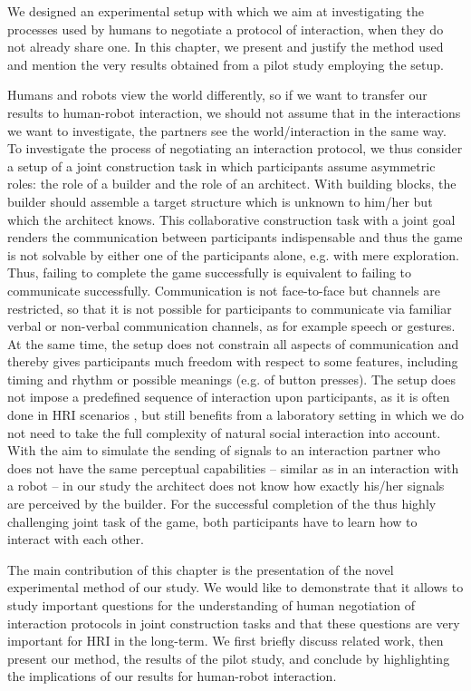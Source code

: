 We designed an experimental setup with which we aim at investigating the processes used by humans to negotiate a protocol of interaction, when they do not already share one. In this chapter, we present and justify the method used and mention the very results obtained from a pilot study employing the setup.

Humans and robots view the world differently, so if we want to transfer our results to human-robot interaction, we should not assume that in the interactions we want to investigate, the partners see the world/interaction in the same way. To investigate the process of negotiating an interaction protocol, we thus consider a setup of a joint construction task in which participants assume asymmetric roles: the role of a builder and the role of an architect. With building blocks, the builder should assemble a target structure which is unknown to him/her but which the architect knows. This collaborative construction task with a joint goal renders the communication between participants indispensable and thus the game is not solvable by either one of the participants alone, e.g. with mere exploration. Thus, failing to complete the game successfully is equivalent to failing to communicate successfully. Communication is not face-to-face but channels are restricted, so that it is not possible for participants to communicate via familiar verbal or non-verbal communication channels, as for example speech or gestures. At the same time, the setup does not constrain all aspects of communication and thereby gives participants much freedom with respect to some features, including timing and rhythm or possible meanings (e.g. of button presses). The setup does not impose a predefined sequence of interaction upon participants, as it is often done in HRI scenarios \cite{akgun12hri}, but still benefits from a laboratory setting in which we do not need to take the full complexity of natural social interaction into account. With the aim to simulate the sending of signals to an interaction partner who does not have the same perceptual capabilities -- similar as in an interaction with a robot -- in our study the architect does not know how exactly his/her signals are perceived by the builder. For the successful completion of the thus highly challenging joint task of the game, both participants have to learn how to interact with each other.

The main contribution of this chapter is the presentation of the novel experimental method of our study. We would like to demonstrate that it allows to study important questions for the understanding of human negotiation of interaction protocols in joint construction tasks and that these questions are very important for HRI in the long-term. We first briefly discuss related work, then present our method, the results of the pilot study, and conclude by highlighting the implications of our results for human-robot interaction.

